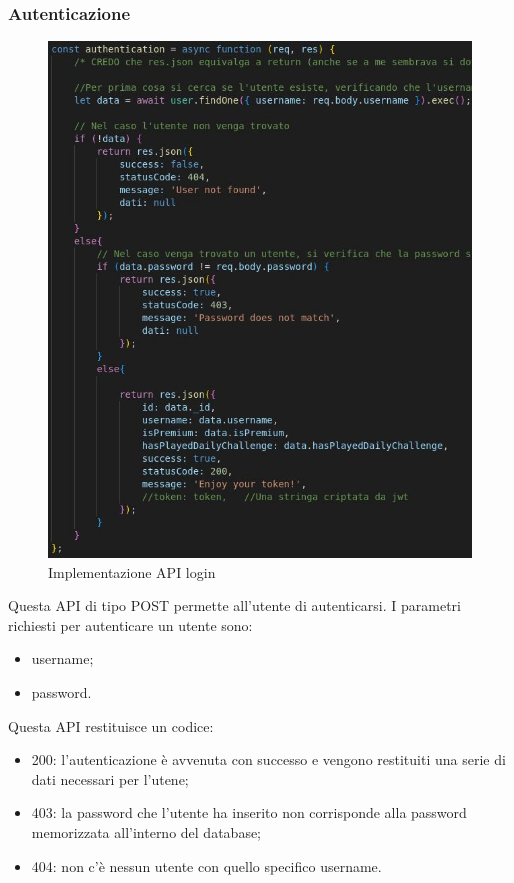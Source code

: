 \newpage
\subsubsection{Autenticazione}
\begin{figure}[!h]
\centering
\includegraphics[scale=0.4]{images/api_authentication.jpg}
\caption{Implementazione API login}
\label{fig:api_authentication}
\end{figure}
\noindent
Questa API di tipo POST permette all'utente di autenticarsi. I parametri richiesti per autenticare un utente sono:
\begin{itemize}
    \item username;
    \item password.
\end{itemize}
Questa API restituisce un codice:
\begin{itemize}
    \item 200: l'autenticazione è avvenuta con successo e vengono restituiti una serie di dati necessari per l'utene;
    \item 403: la password che l'utente ha inserito non corrisponde alla password memorizzata all'interno del database;
    \item 404: non c'è nessun utente con quello specifico username.
\end{itemize}

